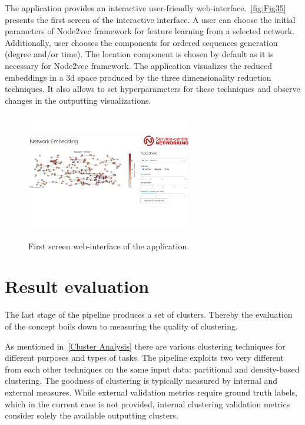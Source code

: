 The application provides an interactive user-friendly web-interface.~\autoref{fig:Fig35} presents the first screen of the interactive interface. A user can choose the initial parameters of Node2vec framework for feature learning from a selected network. Additionally, user chooses the components for ordered sequences generation (degree and/or time). The location component is chosen by default as it is necessary for Node2vec framework. The application visualizes the reduced embeddings in a 3d space produced by the three dimensionality reduction techniques. It also allows to set hyperparameters for these techniques and observe changes in the outputting visualizations.

\begin{figure}[!ht]
	\centering
	\includegraphics[width=0.65\textwidth]{images/Fig35.pdf}\\
	\caption{First screen web-interface of the application.}
	\label{fig:Fig35}
\end{figure}

\section{Result evaluation}
\label{Result evaluation}

The last stage of the pipeline produces a set of clusters. Thereby the evaluation of the concept boils down to measuring the quality of clustering.

As mentioned in~\ref{Cluster Analysis} there are various clustering techniques for different purposes and types of tasks. The pipeline exploits two very different from each other techniques on the same input data: partitional and density-based clustering. The goodness of clustering is typically measured by internal and external measures. While external validation metrics require ground truth labels, which in the current case is not provided, internal clustering validation metrics consider solely the available outputting clusters.

